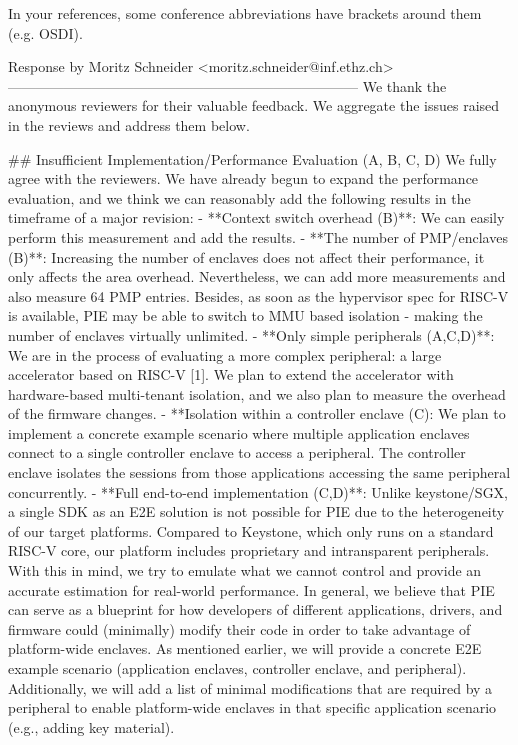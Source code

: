 In your references, some conference abbreviations have brackets around them (e.g. {OSDI}).



Response by Moritz Schneider <moritz.schneider@inf.ethz.ch>
---------------------------------------------------------------------------
We thank the anonymous reviewers for their valuable feedback. We aggregate the issues raised in the reviews and address them below. 

## Insufficient Implementation/Performance Evaluation (A, B, C, D)
We fully agree with the reviewers. We have already begun to expand the performance evaluation, and we think we can reasonably add the following results in the timeframe of a major revision:
- **Context switch overhead (B)**: We can easily perform this measurement and add the results.
- **The number of PMP/enclaves (B)**: Increasing the number of enclaves does not affect their performance, it only affects the area overhead. Nevertheless, we can add more measurements and also measure 64 PMP entries. Besides, as soon as the hypervisor spec for RISC-V is available, PIE may be able to switch to MMU based isolation - making the number of enclaves virtually unlimited. 
- **Only simple peripherals (A,C,D)**: We are in the process of evaluating a more complex peripheral: a large accelerator based on RISC-V [1]. We plan to extend the accelerator with hardware-based multi-tenant isolation, and we also plan to measure the overhead of the firmware changes.
- **Isolation within a controller enclave (C): We plan to implement a concrete example scenario where multiple application enclaves connect to a single controller enclave to access a peripheral. The controller enclave isolates the sessions from those applications accessing the same peripheral concurrently.
- **Full end-to-end implementation (C,D)**: Unlike keystone/SGX, a single SDK as an E2E solution is not possible for PIE due to the heterogeneity of our target platforms. Compared to Keystone, which only runs on a standard RISC-V core, our platform includes proprietary and intransparent peripherals. With this in mind, we try to emulate what we cannot control and provide an accurate estimation for real-world performance. In general, we believe that PIE can serve as a blueprint for how developers of different applications, drivers, and firmware could (minimally) modify their code in order to take advantage of platform-wide enclaves. As mentioned earlier, we will provide a concrete E2E example scenario (application enclaves, controller enclave, and peripheral). Additionally, we will add a list of minimal modifications that are required by a peripheral to enable platform-wide enclaves in that specific application scenario (e.g., adding key material).

